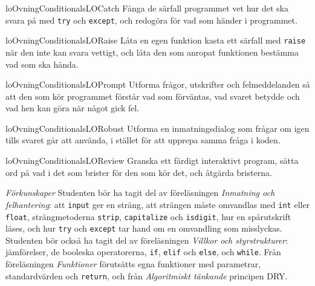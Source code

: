 \begin{restatable}{lo}{OvningConditionalsLOCatch}%
  \label{OvningConditionalsLOCatch}%
  Fånga de särfall programmet vet hur det ska svara på med
  \texttt{try} och \texttt{except}, och
  redogöra för vad som händer i programmet.
\end{restatable}
\begin{restatable}{lo}{OvningConditionalsLORaise}%
  \label{OvningConditionalsLORaise}%
  Låta en egen funktion kasta ett särfall med
  \texttt{raise} när den inte kan svara vettigt, och låta
  den som anropat funktionen bestämma vad som ska hända.
\end{restatable}
\begin{restatable}{lo}{OvningConditionalsLOPrompt}%
  \label{OvningConditionalsLOPrompt}%
  Utforma frågor, utskrifter och felmeddelanden så att den som kör
  programmet förstår vad som förväntas, vad svaret betydde och vad hen
  kan göra när något gick fel.
\end{restatable}
\begin{restatable}{lo}{OvningConditionalsLORobust}%
  \label{OvningConditionalsLORobust}%
  Utforma en inmatningsdialog som frågar om igen tills svaret går att
  använda, i stället för att upprepa samma fråga i koden.
\end{restatable}
\begin{restatable}{lo}{OvningConditionalsLOReview}%
  \label{OvningConditionalsLOReview}%
  Granska ett färdigt interaktivt program, sätta ord på vad i det som
  brister för den som kör det, och åtgärda bristerna.
\end{restatable}

\emph{Förkunskaper}
Studenten bör ha tagit del av föreläsningen \emph{Inmatning och
felhantering}: att \texttt{input} ger en sträng, att
strängen måste omvandlas med \texttt{int} eller
\texttt{float}, strängmetoderna
\texttt{strip}, \texttt{capitalize} och
\texttt{isdigit}, hur en spårutskrift läses, och hur
\texttt{try} och \texttt{except} tar hand om en
omvandling som misslyckas.  Studenten bör också ha tagit del av
föreläsningen \emph{Villkor och styrstrukturer}: jämförelser, de
booleska operatorerna, \texttt{if}, \texttt{elif}
och \texttt{else}, och \texttt{while}.  Från
föreläsningen \emph{Funktioner} förutsätts egna funktioner med
parametrar, standardvärden och \texttt{return}, och från
\emph{Algoritmiskt tänkande} principen \foreignlanguage{english}{DRY}.
